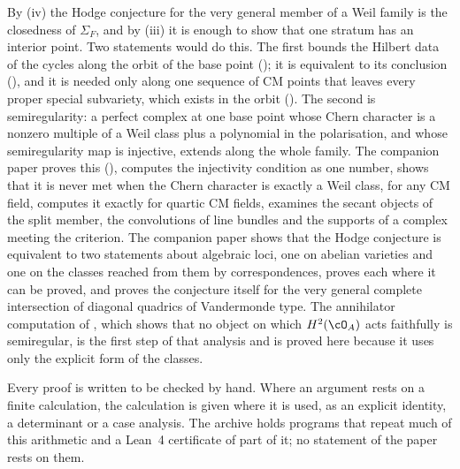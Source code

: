 By (iv) the Hodge conjecture for the very general member of a
Weil family is the closedness of $\Sigma_{F}$, and by (iii) it is enough to
show that one stratum has an interior point. Two statements would do this.
The first bounds the Hilbert data of the cycles along the orbit of the base
point (); it is equivalent to its conclusion
(), and it is needed only along one sequence of CM
points that leaves every proper special subvariety, which exists in the
orbit (). The second is semiregularity: a perfect complex
at one base point whose Chern character is a nonzero multiple of a Weil
class plus a polynomial in the polarisation, and whose semiregularity map is
injective, extends along the whole family. The companion paper
\cite{paperII} proves this (\cite[Theorem~2.3]{paperII}), computes the
injectivity condition as one number, shows that it is never met when the
Chern character is exactly a Weil class, for any CM field, computes it
exactly for quartic CM fields, examines the secant objects of the split
member, the convolutions of line bundles and the supports of a complex
meeting the criterion. The companion paper \cite{paperIII} shows that the
Hodge conjecture is equivalent to two statements about algebraic loci, one on
abelian varieties and one on the classes reached from them by
correspondences, proves each where it can be proved, and proves the
conjecture itself for the very general complete intersection of diagonal
quadrics of Vandermonde type. The annihilator computation of
, which shows that no object on which $H^{2}(\cO_{A})$ acts
faithfully is semiregular, is the first step of that analysis and is proved
here because it uses only the explicit form of the classes.

Every proof is written to be checked by hand. Where an argument rests on a
finite calculation, the calculation is given where it is used, as an explicit
identity, a determinant or a case analysis. The archive \cite{BMB26} holds
programs that repeat much of this arithmetic and a Lean~4 certificate of
part of it; no statement of the paper rests on them.
